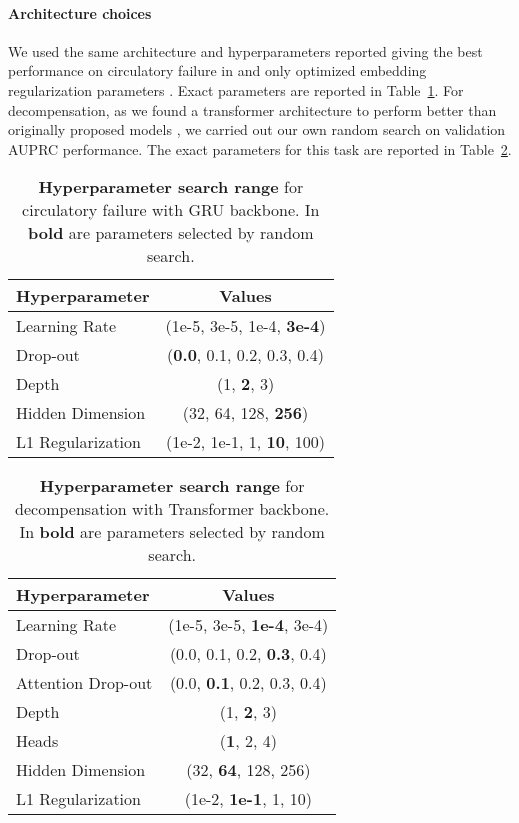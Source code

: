 \documentclass[nohyperref]{article}
\begin{document}
\paragraph{Architecture choices} We used the same architecture and hyperparameters reported giving the best performance on {circulatory failure} in \citet{yeche2021} and only optimized embedding regularization parameters \citep{tomavsev2019}. Exact parameters are reported in Table~\ref{tab:hp-search-gru}. For {decompensation}, as we found a transformer architecture to perform better than originally proposed models \citep{harutyunyan2019multitask}, we carried out our own random search on validation AUPRC performance. The exact parameters for this task are reported in Table~\ref{tab:hp-search-decomp}. 





\begin{table}[tbh!]
    \centering
\caption{\textbf{Hyperparameter search range} for {circulatory failure} with GRU \citep{DBLP:journals/corr/ChungGCB14} backbone. In \textbf{bold} are parameters selected by random search.}
\begin{tabular}{lc}
\toprule
Hyperparameter & Values\\
\midrule
\midrule
Learning Rate & (1e-5, 3e-5, 1e-4, \textbf{3e-4}) \\
\midrule
Drop-out & (\textbf{0.0}, 0.1, 0.2, 0.3, 0.4) \\
\midrule
Depth &   (1, \textbf{2}, 3) \\
\midrule
Hidden Dimension & (32, 64, 128, \textbf{256}) \\
\midrule
L1 Regularization &  (1e-2, 1e-1, 1, \textbf{10}, 100)\\
\bottomrule
\end{tabular}
\label{tab:hp-search-gru}
\end{table}




\begin{table}[tbh!]
    \centering
\caption{\textbf{Hyperparameter search range} for {decompensation} with Transformer \citep{DBLP:conf/nips/VaswaniSPUJGKP17} backbone. In \textbf{bold} are parameters selected by random search.}
\begin{tabular}{lc}
\toprule
Hyperparameter & Values\\
\midrule
\midrule
Learning Rate & (1e-5, 3e-5, \textbf{1e-4}, 3e-4) \\
\midrule
Drop-out & (0.0, 0.1, 0.2, \textbf{0.3}, 0.4) \\
\midrule
Attention Drop-out &   (0.0, \textbf{0.1}, 0.2, 0.3, 0.4) \\
\midrule
Depth &   (1, \textbf{2}, 3) \\
\midrule
Heads &  (\textbf{1}, 2, 4) \\
\midrule
Hidden Dimension &  (32, \textbf{64}, 128, 256) \\
\midrule
L1 Regularization &  (1e-2, \textbf{1e-1}, 1, 10)\\
\bottomrule
\end{tabular}
\label{tab:hp-search-decomp}
\end{table}
\end{document}
